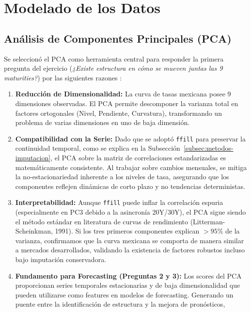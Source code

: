 \documentclass[11pt]{article}
\begin{document}
\section{Modelado de los Datos}

\subsection{Análisis de Componentes Principales (PCA)}

Se seleccionó el PCA como herramienta central para responder la primera pregunta del ejercicio (\textit{¿Existe estructura en cómo se mueven juntas las 9 maturities?}) por las siguientes razones :

\begin{enumerate}
    \item \textbf{Reducción de Dimensionalidad:} La curva de tasas mexicana posee 9 dimensiones observadas. El PCA permite descomponer la varianza total en factores ortogonales (Nivel, Pendiente, Curvatura), transformando un problema de varias dimensiones en uno de baja dimensión. 
    
    \item \textbf{Compatibilidad con la Serie:} Dado que se adoptó \texttt{ffill} para preservar la continuidad temporal, como se explica en la Subsección~\ref{subsec:metodos-imputacion}, el PCA sobre la matriz de correlaciones estandarizadas es matemáticamente consistente. Al trabajar sobre cambios mensuales, se mitiga la no-estacionariedad inherente a los niveles de tasa, asegurando que los componentes reflejen dinámicas de corto plazo y no tendencias deterministas.
    
    \item \textbf{Interpretabilidad:} Aunque \texttt{ffill} puede inflar la correlación espuria (especialmente en PC3 debido a la asincronía 20Y/30Y), el PCA sigue siendo el método estándar en literatura de curvas de rendimiento (Litterman-Scheinkman, 1991). Si los tres primeros componentes explican $>95\%$ de la varianza, confirmamos que la curva mexicana se comporta de manera similar a mercados desarrollados, validando la existencia de factores robustos incluso bajo imputación conservadora.
    
    \item \textbf{Fundamento para Forecasting (Preguntas 2 y 3):} Los scores del PCA proporcionan series temporales estacionarias y de baja dimensionalidad que pueden utilizarse como features en modelos de forecasting. Generando un puente entre la identificación de estructura y la mejora de pronósticos, 

\end{enumerate}
\end{document}
